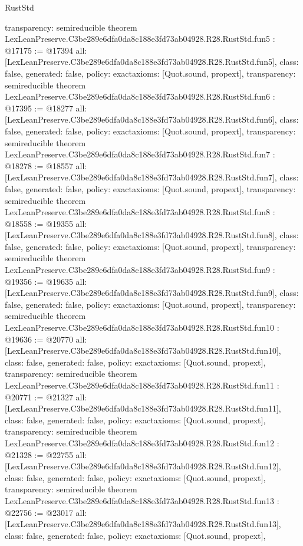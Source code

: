 \begin{lexlean}{RustStd}
\begin{coremodule}
{  transparency: semireducible
}
theorem LexLeanPreserve.C3be289e6dfa0da8c188e3fd73ab04928.R28.RustStd.fun5 : @17175 := @17394 {
  all: [LexLeanPreserve.C3be289e6dfa0da8c188e3fd73ab04928.R28.RustStd.fun5],
  class: false,
  generated: false,
  policy: exact{axioms: [Quot.sound, propext]},
  transparency: semireducible
}
theorem LexLeanPreserve.C3be289e6dfa0da8c188e3fd73ab04928.R28.RustStd.fun6 : @17395 := @18277 {
  all: [LexLeanPreserve.C3be289e6dfa0da8c188e3fd73ab04928.R28.RustStd.fun6],
  class: false,
  generated: false,
  policy: exact{axioms: [Quot.sound, propext]},
  transparency: semireducible
}
theorem LexLeanPreserve.C3be289e6dfa0da8c188e3fd73ab04928.R28.RustStd.fun7 : @18278 := @18557 {
  all: [LexLeanPreserve.C3be289e6dfa0da8c188e3fd73ab04928.R28.RustStd.fun7],
  class: false,
  generated: false,
  policy: exact{axioms: [Quot.sound, propext]},
  transparency: semireducible
}
theorem LexLeanPreserve.C3be289e6dfa0da8c188e3fd73ab04928.R28.RustStd.fun8 : @18558 := @19355 {
  all: [LexLeanPreserve.C3be289e6dfa0da8c188e3fd73ab04928.R28.RustStd.fun8],
  class: false,
  generated: false,
  policy: exact{axioms: [Quot.sound, propext]},
  transparency: semireducible
}
theorem LexLeanPreserve.C3be289e6dfa0da8c188e3fd73ab04928.R28.RustStd.fun9 : @19356 := @19635 {
  all: [LexLeanPreserve.C3be289e6dfa0da8c188e3fd73ab04928.R28.RustStd.fun9],
  class: false,
  generated: false,
  policy: exact{axioms: [Quot.sound, propext]},
  transparency: semireducible
}
theorem LexLeanPreserve.C3be289e6dfa0da8c188e3fd73ab04928.R28.RustStd.fun10 : @19636 := @20770 {
  all: [LexLeanPreserve.C3be289e6dfa0da8c188e3fd73ab04928.R28.RustStd.fun10],
  class: false,
  generated: false,
  policy: exact{axioms: [Quot.sound, propext]},
  transparency: semireducible
}
theorem LexLeanPreserve.C3be289e6dfa0da8c188e3fd73ab04928.R28.RustStd.fun11 : @20771 := @21327 {
  all: [LexLeanPreserve.C3be289e6dfa0da8c188e3fd73ab04928.R28.RustStd.fun11],
  class: false,
  generated: false,
  policy: exact{axioms: [Quot.sound, propext]},
  transparency: semireducible
}
theorem LexLeanPreserve.C3be289e6dfa0da8c188e3fd73ab04928.R28.RustStd.fun12 : @21328 := @22755 {
  all: [LexLeanPreserve.C3be289e6dfa0da8c188e3fd73ab04928.R28.RustStd.fun12],
  class: false,
  generated: false,
  policy: exact{axioms: [Quot.sound, propext]},
  transparency: semireducible
}
theorem LexLeanPreserve.C3be289e6dfa0da8c188e3fd73ab04928.R28.RustStd.fun13 : @22756 := @23017 {
  all: [LexLeanPreserve.C3be289e6dfa0da8c188e3fd73ab04928.R28.RustStd.fun13],
  class: false,
  generated: false,
  policy: exact{axioms: [Quot.sound, propext]},
}
\end{coremodule}
\end{lexlean}
